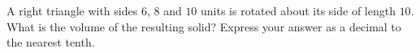 A right triangle with sides $6$, $8$ and $10$ units is rotated about its side of length $10$. What is the volume of the resulting solid? Express your answer as a decimal to the nearest tenth.
